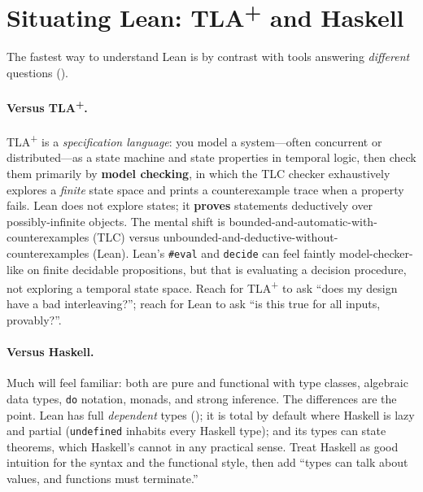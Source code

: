 \documentclass[11pt]{article}
\newcommand{\code}[1]{\lstinline[basicstyle=\ttfamily]|#1|}
\begin{document}
\section{Situating Lean: TLA\texorpdfstring{\textsuperscript{+}}{+} and Haskell}\label{sec:situate}
The fastest way to understand Lean is by contrast with tools answering
\emph{different} questions ().

\paragraph{Versus TLA\textsuperscript{+}.} TLA\textsuperscript{+} is a
\emph{specification language}: you model a system---often concurrent or
distributed---as a state machine and state properties in temporal logic, then
check them primarily by \textbf{model checking}, in which the TLC checker
exhaustively explores a \emph{finite} state space and prints a counterexample
trace when a property fails. Lean does not explore states; it \textbf{proves}
statements deductively over possibly-infinite objects. The mental shift is
bounded-and-automatic-with-counterexamples (TLC) versus
unbounded-and-deductive-without-counterexamples (Lean). Lean's \code{#eval} and
\code{decide} can feel faintly model-checker-like on finite decidable
propositions, but that is evaluating a decision procedure, not exploring a
temporal state space. Reach for TLA\textsuperscript{+} to ask ``does my design
have a bad interleaving?''; reach for Lean to ask ``is this true for all inputs,
provably?''.

\paragraph{Versus Haskell.} Much will feel familiar: both are pure and
functional with type classes, algebraic data types, \code{do} notation, monads,
and strong inference. The differences are the point. Lean has full
\emph{dependent} types (); it is total by default where Haskell is
lazy and partial (\code{undefined} inhabits every Haskell type); and its types
can state theorems, which Haskell's cannot in any practical sense. Treat Haskell
as good intuition for the syntax and the functional style, then add
``types can talk about values, and functions must terminate.''
\end{document}
